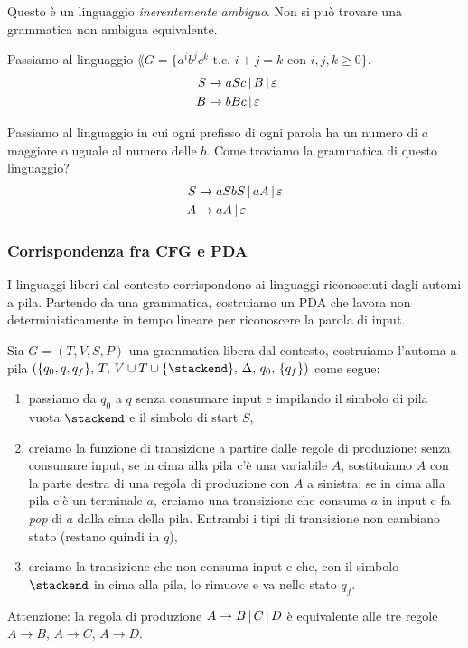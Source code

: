 Questo \`e un linguaggio \emph{inerentemente ambiguo}.
Non si pu\`o trovare una grammatica non ambigua equivalente.

Passiamo al linguaggio $\lang{G} = \{ a^i b^j c^k \text{ t.c. } i + j = k \text{ con } i,j,k \ge 0 \}$.
\begin{align*}
	S &\to aSc \, | \, B \, | \, \varepsilon \\\
	B &\to bBc \, | \, \varepsilon
\end{align*}

Passiamo al linguaggio in cui ogni prefisso di ogni parola ha un numero di $a$ maggiore o uguale al numero delle $b$.
Come troviamo la grammatica di questo linguaggio?
\begin{align*}
	S &\to aSbS \, | \, aA \, | \, \varepsilon \\
	A &\to aA \, | \, \varepsilon
\end{align*}

\subsubsection{Corrispondenza fra CFG e PDA}

I linguaggi liberi dal contesto corrispondono ai linguaggi riconosciuti dagli automi a pila.
Partendo da una grammatica, costruiamo un PDA che lavora non deterministicamente in tempo lineare per riconoscere la parola di input.

Sia $G = (T, V, S, P)$ una grammatica libera dal contesto, costruiamo l'automa a pila $(\{q_0, q, q_f\}, \, T, \, V \cup T \cup \{ \stackend \}, \, \Delta, \, q_0, \, \{q_f\})$ come segue:
\begin{enumerate}
	\item passiamo da $q_0$ a $q$ senza consumare input e impilando il simbolo di pila vuota $\stackend$ e il simbolo di start $S$,
	\item creiamo la funzione di transizione a partire dalle regole di produzione: senza consumare input, se in cima alla pila c'\`e una variabile $A$, sostituiamo $A$ con la parte destra di una regola di produzione con $A$ a sinistra; se in cima alla pila c'\`e un terminale $a$, creiamo una transizione che consuma $a$ in input e fa \emph{pop} di $a$ dalla cima della pila. Entrambi i tipi di transizione non cambiano stato (restano quindi in $q$),
	\item creiamo la transizione che non consuma input e che, con il simbolo $\stackend$ in cima alla pila, lo rimuove e va nello stato $q_f$.
\end{enumerate}
Attenzione: la regola di produzione $A \to B \, | \, C \, | \, D$ \`e equivalente alle tre regole $A \to B$, $A \to C$, $A \to D$.

